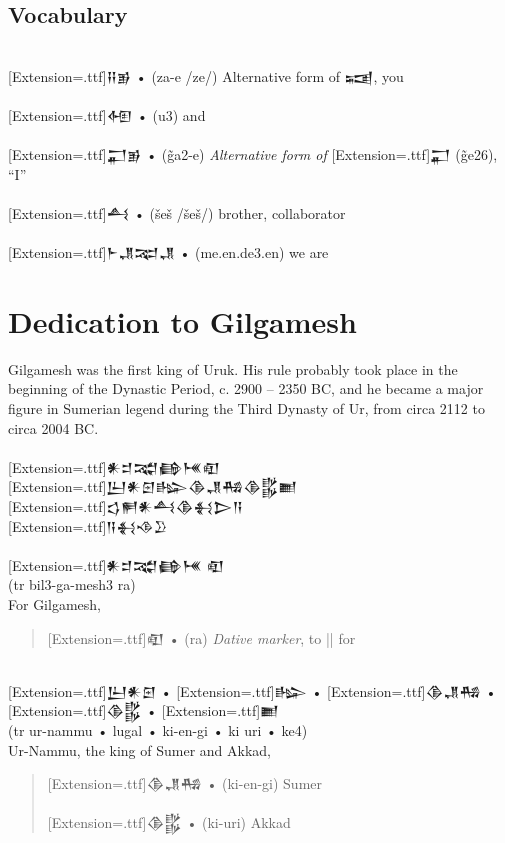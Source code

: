 \documentclass[a4paper,12pt]{book}
\newcommand{\fcn}{\setmainfont{Akkadian}[Extension=.ttf]}
\newcommand{\fcm}{\large\setmainfont{Akkadian}[Extension=.ttf]}
\newcommand{\fsm}{\Large\setmainfont{Akkadian}[Extension=.ttf]}
\begin{document}
\subsection*{Vocabulary}
\verb||\\
{\fsm 𒍝𒂊} • (za-e /ze/) Alternative form of 𒍢, you\\
\verb||\\   
{\fsm 𒅇} • (u3) and\\
\verb||\\    
{\fsm 𒂷𒂊} • (g̃a2-e) {\em Alternative form of}
  {\fcn 𒂷} (g̃e26), “I”\\
\verb||\\
{\fsm 𒋀} • (šeš /šeš/) brother, collaborator\\
\verb||\\
{\fsm 𒈨𒂗𒉈𒂗} • (me.en.de3.en) we are\\

\section*{Dedication to Gilgamesh}
Gilgamesh was the first king of Uruk. His rule
probably took place in the beginning of the
Dynastic Period, c. 2900 – 2350 BC, and he became
a major figure in Sumerian legend during the
Third Dynasty of Ur, from circa 2112 to circa 2004 BC.\\

\verb||\\
{\fsm 𒀭𒄑𒉋𒂵𒎌𒊏}\\
{\fsm 𒌨𒀭𒇉𒈗𒆠𒂗𒄀𒆠𒌵𒆤}\\
{\fsm 𒌓𒂍𒀭𒋀𒆠𒈬𒆕𒀀}\\
{\fsm 𒀀𒈬𒈾𒊒}\\

\verb||\\
{\large\fcn 𒀭𒄑𒉋𒂵𒎌 𒊏}\\
(tr bil3-ga-mesh3 ra)\\
For Gilgamesh,
\begin{quote}
{\fcm 𒊏} • (ra) {\em Dative marker}, to || for\\
\end{quote}

\verb||\\
{\fcm 𒌨𒀭𒇉} • {\fcm 𒈗} • {\fcm 𒆠𒂗𒄀}
     • {\fcm 𒆠𒌵} • {\fcm 𒆤}\\
(tr ur-nammu  • lugal  • ki-en-gi • ki uri • ke4)\\
Ur-Nammu, the king of Sumer and Akkad,\\
\begin{quote}
{\fcm 𒆠𒂗𒄀} • (ki-en-gi) Sumer\\
\verb||\\  
{\fcm 𒆠𒌵} • (ki-uri) Akkad
\end{quote}
\end{document}
